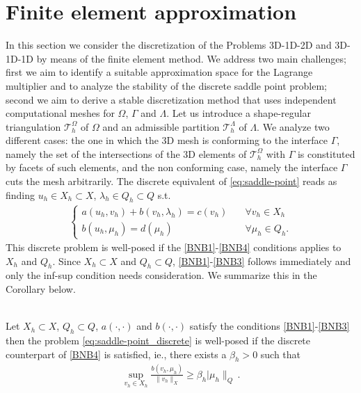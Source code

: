 \section{Finite element approximation}
In this section we consider the discretization of the Problems 3D-1D-2D and 3D-1D-1D by means of the finite element method. We address two main challenges; first we aim to identify a suitable approximation space for the Lagrange multiplier and to analyze the stability of the discrete saddle point problem; second we aim to derive a stable discretization method that uses independent computational meshes for $\Omega$, $\Gamma$ and $\Lambda$. Let us introduce a shape-regular triangulation $\mathcal{T}^{\Omega}_h$ of $\Omega$ and an admissible partition $\mathcal{T}^{\Lambda}_{h}$ of $\Lambda$.
We analyze two different cases: the one in which the 3D mesh is conforming to the interface $\Gamma$, namely the set of the intersections of the 3D elements of $\mathcal{T}^{\Omega}_h$ with $\Gamma$ is constituted by facets of such elements, and the non conforming case, namely the interface $\Gamma$ cuts the mesh arbitrarily. The discrete equivalent of \eqref{eq:saddle-point} reads as finding $u_h\in X_h\subset X$, $\lambda_h\in Q_h\subset Q$ s.t.
\begin{eqnarray}\label{eq:saddle-point_discrete}
\begin{cases}
a(u_h,v_h)+b(v_h,\lambda_h)=c(v_h)\quad &\forall v_h\in X_h\\
b(u_h,\mu_h)=d(\mu_h) \quad &\forall \mu_h\in Q_h.
\end{cases}
\end{eqnarray}
This discrete problem is well-posed if the \eqref{BNB1}-\eqref{BNB4} conditions applies to $X_h$ and $Q_h$. Since $X_h\subset X$ and $Q_h\subset Q$,  
\eqref{BNB1}-\eqref{BNB3} follows immediately and only the inf-sup condition needs consideration.  We summarize this in the Corollary below. 
\begin{corollary}{\cite[Theorem 2.42]{MR2050138}}\\
Let
$X_h \subset X$, $Q_h \subset Q$, $a(\cdot, \cdot)$ and $b(\cdot, \cdot)$ satisfy the conditions  \eqref{BNB1}-\eqref{BNB3} then  
the problem \eqref{eq:saddle-point_discrete} is well-posed if 
the discrete counterpart of \eqref{BNB4} is satisfied, ie., 
there exists a $\beta_h>0$ such that
\begin{align}
\label{eq:infsup_discrete}
 \sup_{v_h\in X_h} \frac{b(v_h,\mu_h)}{\|v_h\|_{X}}\geq \beta_h |\mu_h\|_{Q}\, .
\end{align}
\end{corollary}



